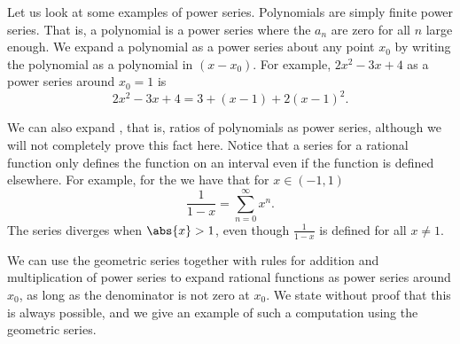\documentclass[12pt]{book}
\begin{document}
Let us look at some examples of power series.
Polynomials are simply finite power series.
That is, a polynomial
is a power series where
the $a_n$ are zero for all $n$ large enough.
We expand
a polynomial as a power series about any point $x_0$ by writing
the polynomial as a polynomial in $(x-x_0)$.
For example,
$2x^2-3x+4$ as a power series around $x_0 = 1$ is
\begin{equation*}
2x^2-3x+4 = 3 + (x-1) + 2{(x-1)}^2 .
\end{equation*}

We can also expand
\emph{}, that is, ratios of polynomials
as power series, although we will not completely prove this fact here.
Notice that a series for a rational function only defines the function
on an interval even if the function is defined elsewhere.
For example, for
the \emph{} we have that for
$x \in (-1,1)$
\begin{equation*}
\frac{1}{1-x} =
\sum_{n=0}^\infty x^n .
\end{equation*}
The series diverges when $\abs{x} > 1$, even though $\frac{1}{1-x}$ is
defined for all $x \not= 1$.

We can use the geometric series together with rules for addition and
multiplication of power series to expand rational functions as power
series around $x_0$,
as long as the denominator is not zero at $x_0$.
We state without
proof that this is always possible, and we give an example of such
a computation using the geometric series.
\end{document}
